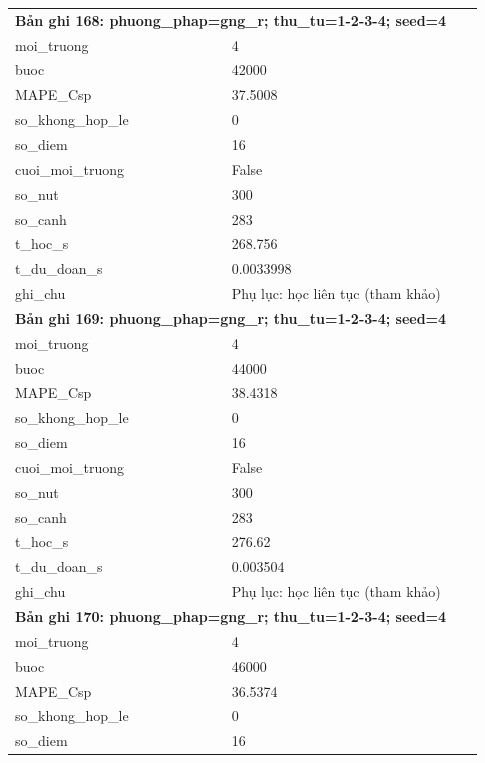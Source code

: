 \begin{longtable}{p{0.43\linewidth}p{0.50\linewidth}}
\midrule
\multicolumn{2}{p{0.95\linewidth}}{\textbf{Bản ghi 168: phuong\_phap=gng\_r; thu\_tu=1-2-3-4; seed=4}} \\
moi\_\allowbreak truong & 4 \\
buoc & 42000 \\
MAPE\_\allowbreak Csp & 37.5008 \\
so\_\allowbreak khong\_\allowbreak hop\_\allowbreak le & 0 \\
so\_\allowbreak diem & 16 \\
cuoi\_\allowbreak moi\_\allowbreak truong & False \\
so\_\allowbreak nut & 300 \\
so\_\allowbreak canh & 283 \\
t\_\allowbreak hoc\_\allowbreak s & 268.756 \\
t\_\allowbreak du\_\allowbreak doan\_\allowbreak s & 0.0033998 \\
ghi\_\allowbreak chu & Phụ lục: học liên tục (tham khảo) \\
\midrule
\multicolumn{2}{p{0.95\linewidth}}{\textbf{Bản ghi 169: phuong\_phap=gng\_r; thu\_tu=1-2-3-4; seed=4}} \\
moi\_\allowbreak truong & 4 \\
buoc & 44000 \\
MAPE\_\allowbreak Csp & 38.4318 \\
so\_\allowbreak khong\_\allowbreak hop\_\allowbreak le & 0 \\
so\_\allowbreak diem & 16 \\
cuoi\_\allowbreak moi\_\allowbreak truong & False \\
so\_\allowbreak nut & 300 \\
so\_\allowbreak canh & 283 \\
t\_\allowbreak hoc\_\allowbreak s & 276.62 \\
t\_\allowbreak du\_\allowbreak doan\_\allowbreak s & 0.003504 \\
ghi\_\allowbreak chu & Phụ lục: học liên tục (tham khảo) \\
\midrule
\multicolumn{2}{p{0.95\linewidth}}{\textbf{Bản ghi 170: phuong\_phap=gng\_r; thu\_tu=1-2-3-4; seed=4}} \\
moi\_\allowbreak truong & 4 \\
buoc & 46000 \\
MAPE\_\allowbreak Csp & 36.5374 \\
so\_\allowbreak khong\_\allowbreak hop\_\allowbreak le & 0 \\
so\_\allowbreak diem & 16 \\

\end{longtable}
